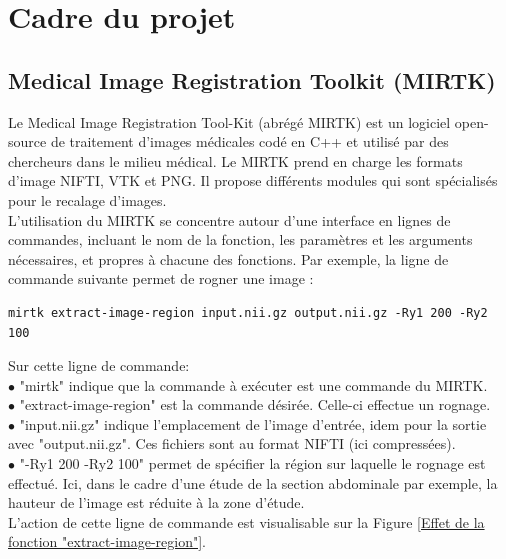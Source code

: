 \documentclass[10pt]{report}
\begin{document}
	\section{Cadre du projet} 
	\subsection{Medical Image Registration Toolkit (MIRTK)}
	Le Medical Image Registration Tool-Kit (abrégé MIRTK) est un logiciel open-source de traitement d'images médicales codé en C++ et utilisé par des chercheurs dans le milieu médical. Le MIRTK prend en charge les formats d'image NIFTI, VTK et PNG. Il propose différents modules qui sont spécialisés pour le recalage d'images. \\ 
	L'utilisation du MIRTK se concentre autour d'une interface en lignes de commandes, incluant le nom de la fonction, les paramètres et les arguments nécessaires, et propres à chacune des fonctions. Par exemple, la ligne de commande suivante permet de rogner une image :
	
	\begin{lstlisting}
mirtk extract-image-region input.nii.gz output.nii.gz -Ry1 200 -Ry2 100
	\end{lstlisting}
	
	Sur cette ligne de commande:
	\\{$\bullet$} "mirtk" indique que la commande à exécuter est une commande du MIRTK.
	\\{$\bullet$} "extract-image-region" est la commande désirée. Celle-ci effectue un rognage.
	\\{$\bullet$} "input.nii.gz" indique l'emplacement de l'image d'entrée, idem pour la sortie avec "output.nii.gz". Ces fichiers sont au format NIFTI (ici compressées).
	\\{$\bullet$} "-Ry1 200 -Ry2 100" permet de spécifier la région sur laquelle le rognage est effectué. Ici, dans le cadre d'une étude de la section abdominale par exemple, la hauteur de l'image est réduite à la zone d'étude. 
	\\L'action de cette ligne de commande est visualisable sur la Figure \ref{Effet de la fonction "extract-image-region"}.
	
\end{document}
